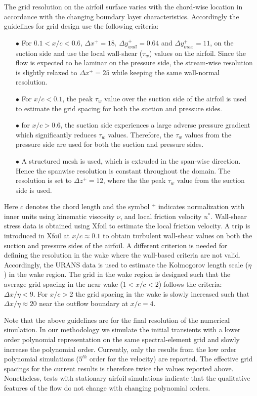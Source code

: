 The grid resolution on the airfoil surface varies with the chord-wise location in accordance with the changing boundary layer characteristics. Accordingly the guidelines for grid design use the following criteria:
\begin{itemize}
	\item[$\bullet$] For $0.1<x/c<0.6$, $\Delta x^{+}=18$, $\Delta y_{wall}^{+}=0.64$ and $\Delta y_{max}^{+}=11$, on the suction side and use the local wall-shear ($\tau_{w}$) values on the airfoil. Since the flow is expected to be laminar on the pressure side, the stream-wise resolution is slightly relaxed to $\Delta x^{+}=25$ while keeping the same wall-normal resolution.
	\item[$\bullet$] For $x/c<0.1$, the peak $\tau_{w}$ value over the suction side of the airfoil is used to estimate the grid spacing for both the suction and pressure sides.
	\item [$\bullet$] for $x/c>0.6$, the suction side experiences a large adverse pressure gradient which significantly reduces $\tau_{w}$ values. Therefore, the $\tau_{w}$ values from the pressure side are used for both the suction and pressure sides.
	\item [$\bullet$] A structured mesh is used, which is extruded in the span-wise direction. Hence the spanwise resolution is constant throughout the domain. The resolution is set to $\Delta z^{+}=12$, where the the peak $\tau_{w}$ value from the suction side is used.
\end{itemize}
Here $c$ denotes the chord length and the symbol $^{+}$ indicates normalization with inner units using kinematic viscosity $\nu$, and local friction velocity $u^{*}$. Wall-shear stress data is obtained using Xfoil to estimate the local friction velocity. A trip is introduced in Xfoil at $x/c\approx0.1$ to obtain turbulent wall-shear values on both the suction and pressure sides of the airfoil. A different criterion is needed for defining the resolution in the wake where the wall-based criteria are not valid. Accordingly, the URANS data is used to estimate the Kolmogorov length scale ($\eta$) in the wake region. The grid in the wake region is designed such that the average grid spacing in the near wake ($1<x/c<2$) follows the criteria: $\Delta x/\eta < 9$. For $x/c>2$ the grid spacing in the wake is slowly increased such that $\Delta x/\eta \approx 20$ near the outflow boundary at $x/c=4$.

Note that the above guidelines are for the final resolution of the numerical simulation. In our methodology we simulate the initial transients with a lower order polynomial representation on the same spectral-element grid and slowly increase the polynomial order. Currently, only the results from the low order polynomial simulations ($5^{th}$ order for the velocity) are reported. The effective grid spacings for the current results is therefore twice the values reported above. Nonetheless, tests with stationary airfoil simulations indicate that the qualitative features of the flow do not change with changing polynomial orders. 

